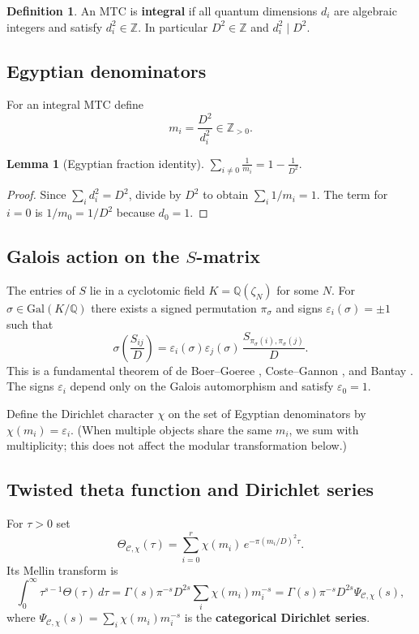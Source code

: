 \documentclass[12pt,a4paper]{article}
\newtheorem{lemma}[theorem]{Lemma}
\theoremstyle{definition}
\newtheorem{definition}[theorem]{Definition}
\theoremstyle{remark}
\begin{document}
\begin{definition}
An MTC is \textbf{integral} if all quantum dimensions $d_i$ are algebraic integers
and satisfy $d_i^2\in\mathbb{Z}$. In particular $D^2\in\mathbb{Z}$ and
$d_i^2\mid D^2$.
\end{definition}

\subsection{Egyptian denominators}

For an integral MTC define
\[
m_i = \frac{D^2}{d_i^2}\in\mathbb{Z}_{>0}.
\]

\begin{lemma}[Egyptian fraction identity]
$\displaystyle\sum_{i\neq0}\frac{1}{m_i}=1-\frac1{D^2}.$
\end{lemma}

\begin{proof}
Since $\sum_i d_i^2 = D^2$, divide by $D^2$ to obtain $\sum_i 1/m_i = 1$. The
term for $i=0$ is $1/m_0 = 1/D^2$ because $d_0=1$.
\end{proof}

\subsection{Galois action on the $S$-matrix}

The entries of $S$ lie in a cyclotomic field $K = \mathbb{Q}(\zeta_N)$ for some
$N$. For $\sigma\in\mathrm{Gal}(K/\mathbb{Q})$ there exists a signed permutation
$\pi_\sigma$ and signs $\varepsilon_i(\sigma)=\pm1$ such that
\[
\sigma\!\left(\frac{S_{ij}}{D}\right)
  = \varepsilon_i(\sigma)\varepsilon_j(\sigma)\,
    \frac{S_{\pi_\sigma(i),\pi_\sigma(j)}}{D}.
\]
This is a fundamental theorem of de Boer--Goeree \cite{dBG}, Coste--Gannon
\cite{CG}, and Bantay \cite{Bantay}. The signs $\varepsilon_i$ depend only on the
Galois automorphism and satisfy $\varepsilon_0=1$.

Define the Dirichlet character $\chi$ on the set of Egyptian denominators by
$\chi(m_i)=\varepsilon_i$. (When multiple objects share the same $m_i$, we sum
with multiplicity; this does not affect the modular transformation below.)

\subsection{Twisted theta function and Dirichlet series}

For $\tau>0$ set
\[
\Theta_{\mathcal{C},\chi}(\tau)=\sum_{i=0}^r \chi(m_i)\,e^{-\pi (m_i/D)^2\tau}.
\]
Its Mellin transform is
\[
\int_0^\infty \tau^{s-1}\Theta(\tau)\,d\tau
  = \Gamma(s)\pi^{-s}D^{2s}\sum_i \chi(m_i)m_i^{-s}
  = \Gamma(s)\pi^{-s}D^{2s}\Psi_{\mathcal{C},\chi}(s),
\]
where $\Psi_{\mathcal{C},\chi}(s)=\sum_i\chi(m_i)m_i^{-s}$ is the
\textbf{categorical Dirichlet series}.
\end{document}
